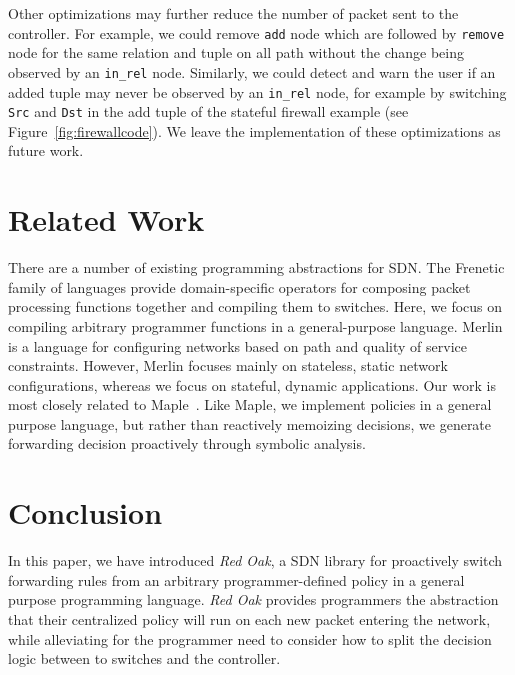 \documentclass[nocopyrightspace]{sigplanconf}
\begin{document}
Other optimizations may further reduce the number of packet sent to the controller. For example, we could remove \lstinline|add| node which are followed by \lstinline|remove| node for the same relation and tuple on all path without the change being observed by an \lstinline|in_rel| node. Similarly, we could detect and warn the user if an added tuple may never be observed by an \lstinline|in_rel| node, for example by switching \lstinline|Src| and \lstinline|Dst| in the add tuple of the stateful firewall example (see Figure~\ref{fig:firewallcode}). We leave the implementation of these optimizations as future work.




\section*{Related Work}
There are a number of existing programming abstractions for SDN. The Frenetic~\citep{Frenetic} family of languages provide domain-specific operators for composing packet processing functions together and compiling them to switches. Here, we focus on compiling arbitrary programmer functions in a general-purpose language. Merlin~\cite{Merlin} is a language for configuring networks based on path and quality of service constraints. However, Merlin focuses mainly on stateless, static network configurations, whereas we focus on stateful, dynamic applications. Our work is most closely related to Maple~\citep{Maple}. Like Maple, we implement policies in a general purpose language, but rather than reactively memoizing decisions, we generate forwarding decision proactively through symbolic analysis.


\section*{Conclusion}
In this paper, we have introduced \textit{Red Oak}, a SDN library for proactively switch forwarding rules
from an arbitrary programmer-defined policy in a general purpose programming language.
\textit{Red Oak} provides programmers the abstraction that their centralized policy will run on each 
new packet entering the network, while alleviating for the programmer need to consider
how to split the decision logic between to switches and the controller.
\end{document}
